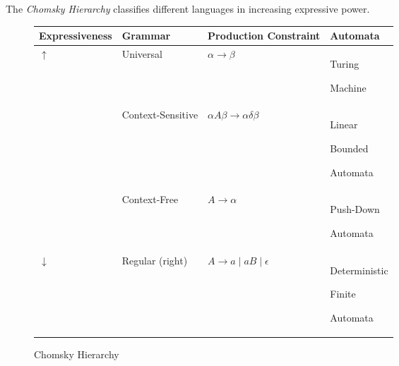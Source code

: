 \begin{definition}
    The \textit{Chomsky Hierarchy} classifies different languages in increasing expressive power.
    
    \begin{figure}[H]
        \centering
        \begin{tabularx}{\textwidth}{@{} X X X X @{}}
            \toprule
            Expressiveness & Grammar & Production Constraint & Automata \\
            \midrule
            $\uparrow$ & Universal & $\alpha \to \beta$ & Turing \par Machine \\
            \phantom{} & Context-Sensitive & $\alpha A \beta \to \alpha \delta \beta$ & Linear \par Bounded \par Automata \\
            \phantom{} & Context-Free & $A \to \alpha$ & Push-Down \par Automata \\
            $\downarrow$ & Regular (right) & $A \to a \mid aB \mid \epsilon$ & Deterministic \par Finite \par Automata \\
            \bottomrule
        \end{tabularx}
        \caption{Chomsky Hierarchy}
        \label{fig:chomsky-hierarachy}
    \end{figure}
\end{definition}


